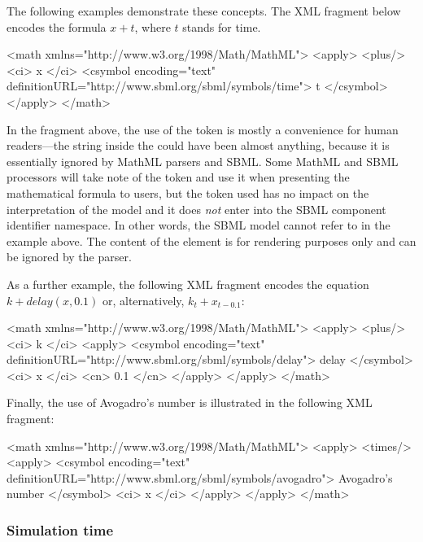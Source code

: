 The following examples demonstrate these concepts.  The XML fragment below
encodes the formula $x + t$, where $t$ stands for time.

\begin{example}

<math xmlns="http://www.w3.org/1998/Math/MathML">
    <apply>
        <plus/>
        <ci> x </ci>
        <csymbol encoding="text" definitionURL="http://www.sbml.org/sbml/symbols/time">
            t
        </csymbol>
    </apply>
</math>
\end{example}

In the fragment above, the use of the token  is mostly a
convenience for human readers---the string inside the
 could have been almost anything, because it is
essentially ignored by MathML parsers and SBML.  Some MathML and
SBML processors will take note of the token and use it when
presenting the mathematical formula to users, but the token used
has no impact on the interpretation of the model and it does
\emph{not} enter into the SBML component identifier namespace.  In
other words, the SBML model cannot refer to  in the
example above.  The content of the  element is for
rendering purposes only and can be ignored by the parser.

As a further example, the following XML fragment encodes the equation
$k + delay(x, 0.1)$ or, alternatively, $k_t + x_{t - 0.1}$:

\begin{example}
<math xmlns="http://www.w3.org/1998/Math/MathML">
    <apply>
        <plus/>
        <ci> k </ci>
        <apply>
            <csymbol encoding="text" definitionURL="http://www.sbml.org/sbml/symbols/delay">
                delay
            </csymbol>
            <ci> x </ci>
            <cn> 0.1 </cn>
        </apply>
    </apply>
</math>
\end{example}

Finally, the use of Avogadro's number is illustrated in the
following XML fragment:

\begin{example}
<math xmlns="http://www.w3.org/1998/Math/MathML">
    <apply>
        <times/>
        <apply>
            <csymbol encoding="text" definitionURL="http://www.sbml.org/sbml/symbols/avogadro">
                Avogadro's number
            </csymbol>
            <ci> x </ci>
        </apply>
    </apply>
</math>
\end{example}


\subsubsection{Simulation time}
\label{sec:meaning-of-time}

